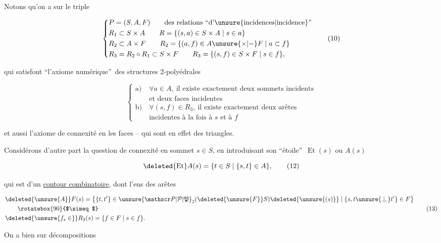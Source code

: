 
Notons qu'on a sur le triple

\[
\left\{\begin{aligned}
 &P=(S,A,F)\qquad\text{des relations ``d'\unsure{incidences|incidence}''}\\
 &R_1\subset S\times A\qquad R=\{(s,a)\in S\times A\mid s\in a\}\\
 &R_2\subset A\times F\qquad R_2=\{(a,f)\in A\unsure{\times|-} F\mid a\subset f\}\\
 &R_3=R_2\circ R_1\subset S\times F\qquad R_3=\{(s,f)\in S\times F\mid s\in f\},
\end{aligned}\right.\tag*{(10)}
\]


qui satisfont ``l'axiome numérique''\ des structures 2-polyédrales

\[
\left\{\begin{aligned}
 \text{a)}\ &\forall a\in A,\ \text{il existe exactement deux sommets incidents}\\
 &\text{et deux faces incidentes}\\
 \text{b)}\ &\forall(s,f)\in R_3,\ \text{il existe exactement deux arêtes}\\
 &\text{incidentes à la fois à }s\text{ et à }f
\end{aligned}\right.\tag*{(11)}
\]

et aussi l'axiome de connexité en les faces -- qui sont en effet des triangles.

Considérons d'autre part la question de connexité en  sommet $s\in S$, en introduisant son ``étoile''\ $\operatorname{Et}(s)$ ou $A(s)$

\[
\deleted{\operatorname{Et}}A(s)=\{t\in S\mid\{s,t\}\in A\},\tag*{(12)}
\]

qui est  d'un  \uline{contour combinatoire}, dont l'ens des arêtes 


\[
\begin{aligned}
 &\deleted{\unsure{A}} F(s)=\bigl\{\{t,t'\}\in\unsure{\mathscr P|\mathcal P|\mathfrak P}_2(\deleted{\unsure{F}}S)\deleted{\unsure{(s)}}\mid\{s,t\unsure{.|,}t'\}\in F\bigr\}\\
 &\qquad\rotatebox{90}{$\simeq$}\\
 &\deleted{\unsure{f_s\in}}R_3(s)=\{f\in F\mid s\in f\}.
\end{aligned}\tag*{(13)}
\]

On a bien sur  décompositions
